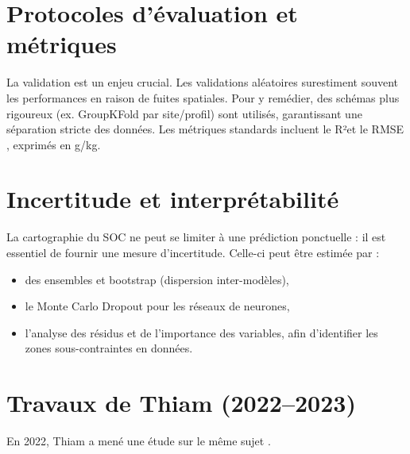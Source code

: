 \documentclass[12pt,a4paper,oneside]{report}
\begin{document}
\section{Protocoles d’évaluation et métriques}

La validation est un enjeu crucial\cite{roberts_cross-validation_2017}. Les validations aléatoires surestiment souvent les performances en raison de fuites spatiales. Pour y remédier, des schémas plus rigoureux (ex. GroupKFold par site/profil) sont utilisés, garantissant une séparation stricte des données. Les métriques standards incluent le R²et le RMSE , exprimés en g/kg.
\section{Incertitude et interprétabilité}
La cartographie du SOC ne peut se limiter à une prédiction ponctuelle : il est essentiel de fournir une mesure d’incertitude\cite{vaysse_using_2017}. Celle-ci peut être estimée par :
\begin{itemize}
  \item des ensembles et bootstrap (dispersion inter-modèles),
  \item le Monte Carlo Dropout pour les réseaux de neurones,
  \item l’analyse des résidus et de l’importance des variables, afin d’identifier les zones sous-contraintes en données.
\end{itemize}
\section{Travaux de Thiam (2022–2023)}

En 2022, Thiam a mené une étude sur le même sujet \cite{Thiam2023}.
\end{document}
